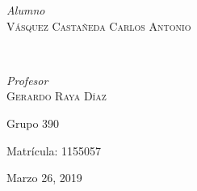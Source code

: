 \documentclass[12pt, letterpaper]{article}
\begin{document}
\begin{titlepage}
{	\begin{minipage}{0.4\textwidth}
		\begin{flushleft}
			\large
			\textit{Alumno}\\
			\textsc{Vásquez Castañeda Carlos Antonio} %
		\end{flushleft}
	\end{minipage}
	~
	\begin{minipage}{0.4\textwidth}
		\begin{flushright}
			\large
			\textit{Profesor}\\
			\textsc{Gerardo Raya Díaz} %
		\end{flushright}
	\end{minipage}
	
	
	
	\vfill
	{\large Grupo 390}

	{\large Matrícula: 1155057}
	\vfill
	\vfill %
	
	{\large Marzo 26, 2019} %
	
	
	 
	
	\vfill %
}	
\end{titlepage}

\end{document}
